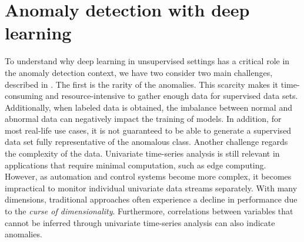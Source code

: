 \section{Anomaly detection with deep learning}
\label{s:ad-with-dl}
To understand why deep learning in unsupervised settings has a critical role in the anomaly detection context, we have two consider two main challenges, described in \cite{choi2021deep}. The first is the rarity of the anomalies. This scarcity makes it time-consuming and resource-intensive to gather enough data for supervised data sets. Additionally, when labeled data is obtained, the imbalance between normal and abnormal data can negatively impact the training of models. In addition, for most real-life use cases, it is not guaranteed to be able to generate a supervised data set fully representative of the anomalous class. Another challenge regards the complexity of the data. Univariate time-series analysis is still relevant in applications that require minimal computation, such as edge computing. However, as automation and control systems become more complex, it becomes impractical to monitor individual univariate data streams separately. With many dimensions, traditional approaches often experience a decline in performance due to the \textit{curse of dimensionality}. Furthermore, correlations between variables that cannot be inferred through univariate time-series analysis can also indicate anomalies. 



